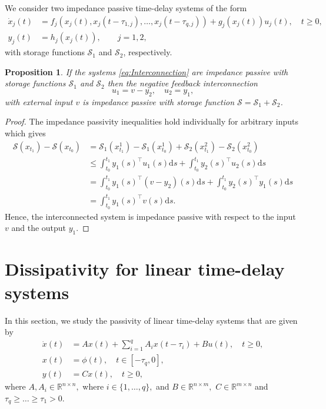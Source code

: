 \documentclass[12pt]{article}
\newtheorem{proposition}{Proposition}
\begin{document}
We consider two impedance passive time-delay systems of the form
\begin{align}\label{eq:Interconnection}
\nonumber 
\dot x_j(t) &= f_j(x_j(t),x_j(t-\tau_{1,j}),\ldots, x_j(t-\tau_{q,j})) 
  + g_j(x_j(t))u_j(t), \quad t\geq 0,\\
y_j(t) &= h_j(x_j(t)),\quad \quad j=1,2,
\end{align}
with storage functions $\mathcal{S}_1$ and $\mathcal{S}_2$, respectively.
\begin{proposition}
If the systems \eqref{eq:Interconnection} are impedance passive  with storage functions $\mathcal{S}_1$ and $\mathcal{S}_2$ then the negative feedback interconnection
\[
u_1=v-y_2, \quad u_2=y_1,
\]
with external input $v$ is impedance passive with storage function $\mathcal{S}=\mathcal{S}_1+\mathcal{S}_2$.  
\end{proposition}
\begin{proof}
The impedance passivity inequalities hold individually for arbitrary inputs which gives
\begin{align*}
\mathcal{S}(x_{t_1})-\mathcal{S}(x_{t_0})&=\mathcal{S}_1(x_{t_1}^1)-\mathcal{S}_1(x_{t_0}^1)+\mathcal{S}_2(x_{t_1}^2)-\mathcal{S}_2(x_{t_0}^2) \\ 
&\leq \int_{t_0}^{t_1}y_1(s)^\top u_1(s)\mathrm{d}s+\int_{t_0}^{t_1}y_2(s)^\top u_2(s)\mathrm{d}s\\
&=\int_{t_0}^{t_1}y_1(s)^\top (v-y_2)(s)\mathrm{d}s+\int_{t_0}^{t_1}y_2(s)^\top y_1(s)\mathrm{d}s\\
&=\int_{t_0}^{t_1}y_1(s)^\top v(s)\mathrm{d}s.
\end{align*}
Hence, the interconnected system is impedance passive with respect to the input $v$ and the output $y_1$.
\end{proof}




\section{Dissipativity for linear time-delay systems}
\label{sec:linear}
In this section, we study the passivity of linear time-delay systems that are given by 
\begin{align}
\nonumber 
\dot x(t) &= Ax(t) + \sum_{i=1}^q A_ix(t-\tau_i)+ 
Bu(t),\quad  t\geq 0,\\
x(t) &= \phi(t),\quad  t \in [-\tau_q , 0], \label{eq:cnt_time_delay_system}
\\
y(t) &= Cx(t),\quad t \geq  0,\nonumber 
    \end{align}
where  
$A,A_i \in \mathbb{R}^{n \times n},$  where $i  \in \{1,\ldots,q\},$ and  $B \in \mathbb{R}^{n \times m},$ $C \in \mathbb{R}^{m \times n}$ and  $\tau_q \geqslant\ldots \geqslant \tau_1 > 0.$
\end{document}
